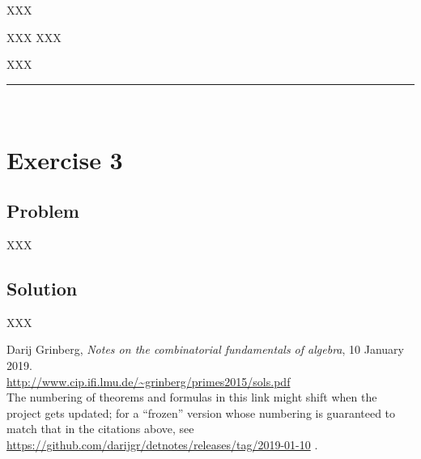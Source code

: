 \documentclass[paper=a4, fontsize=12pt]{scrartcl} %
\newcommand{\horrule}[1]{\rule{\linewidth}{#1}} %
\theoremstyle{plainsl}
\theoremstyle{definition}
\theoremstyle{remark}
\begin{document}
XXX

XXX
XXX

XXX

\horrule{0.3pt} \\[0.4cm]

\section{Exercise 3}

\subsection{Problem}

XXX

\subsection{Solution}

XXX

\begin{thebibliography}{99999999}                                                                                         %


Darij Grinberg,
\textit{Notes on the combinatorial fundamentals of algebra},
10 January 2019. \\
\url{http://www.cip.ifi.lmu.de/~grinberg/primes2015/sols.pdf}
\\
The numbering of theorems and formulas in this link might shift
when the project gets updated; for a ``frozen'' version whose
numbering is guaranteed to match that in the citations above, see
\url{https://github.com/darijgr/detnotes/releases/tag/2019-01-10} .

\end{thebibliography}
\end{document}
